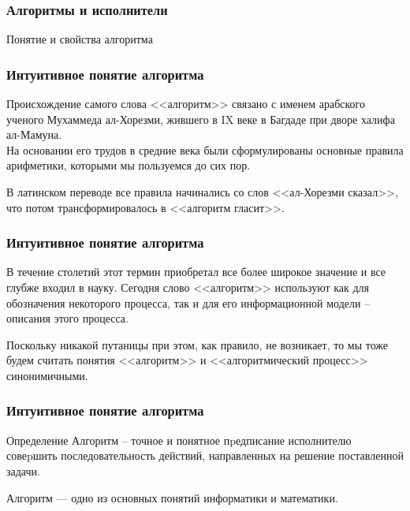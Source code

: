 \subtitle{Лекция 8 --- Алгоритмы и исполнители}

\frame[plain]
{\titlepage}	%


\begin{frame}
\frametitle{Алгоритмы и исполнители}

\begin{center}

\Huge
Понятие и свойства алгоритма
	
\end{center}
\end{frame}

	\begin{frame}
\frametitle{Интуитивное понятие алгоритма}

Происхождение самого слова <<алгоритм>> связано с именем арабского ученого Мухаммеда ал-Хорезми, жившего в IX веке в Багдаде при дворе халифа ал-Мамуна.\\ На основании его трудов в средние века были сформулированы основные правила арифметики, которыми мы пользуемся до сих пор. 

В латинском переводе все правила начинались со слов <<ал-Хорезми сказал>>, что потом трансформировалось в 
<<алгоритм гласит>>.

\end{frame}

\begin{frame}
\frametitle{Интуитивное понятие алгоритма}

В течение столетий этот термин приобретал все более широкое значение и все глубже входил в науку. Сегодня слово <<алгоритм>> используют как для обозначения некоторого процесса, так и для его информационной модели – описания этого процесса. 

Поскольку никакой путаницы при этом, как правило, не возникает, то мы тоже будем считать понятия <<алгоритм>> и <<алгоритмический процесс>> синонимичными.

\end{frame}

\begin{frame}
\frametitle{Интуитивное понятие алгоритма}

\begin{exampleblock}{Определение}
Алгоритм – точное и понятное пpедписание исполнителю совеpшить последовательность действий, направленных на решение поставленной задачи.

\end{exampleblock}

Алгоритм --- одно из основных понятий информатики и математики.
\end{frame}

